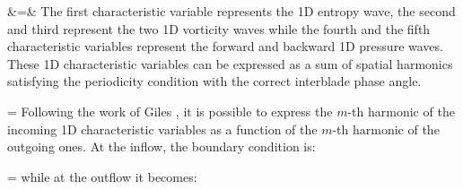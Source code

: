 %
\beq
   &=&
\eeq
%
 The first characteristic variable represents the 1D entropy wave, the second and third
 represent the two 1D vorticity waves while the fourth and the fifth characteristic
 variables represent the forward and backward 1D pressure waves.
 These 1D characteristic variables can be expressed as a
 sum of spatial harmonics satisfying the periodicity condition with the correct
 interblade phase angle.

%
\beq
   = \sum{} 
  \exp{}
\eeq
%
 Following the work of Giles \citeyear{Giles:6},
 it is possible to express the $m$-th harmonic of the
 incoming 1D characteristic variables as a function of the
 $m$-th harmonic of the outgoing ones.
 At the inflow, the boundary condition is:

%
\beq
   =
  \label{inflow_bc}
\eeq
%
 while at the outflow it becomes:

